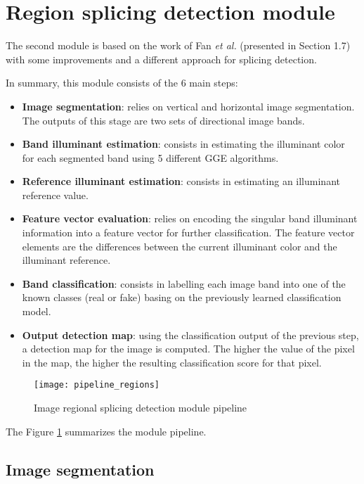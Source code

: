 \section{Region splicing detection module}

The second module is based on the work of Fan \emph{et al.}\cite{fan2015image} (presented in Section 1.7) with some improvements and a different approach for splicing detection.

In summary, this module consists of the 6 main steps:

\begin{itemize}
\item \textbf{Image segmentation}: relies on vertical and horizontal image segmentation. The outputs of this stage are two sets of directional image bands. 
\item \textbf{Band illuminant estimation}: consists in estimating the illuminant color for each segmented band using 5 different GGE algorithms.
\item \textbf{Reference illuminant estimation}: consists in estimating an illuminant reference value.
\item \textbf{Feature vector evaluation}: relies on encoding the singular band illuminant information into a feature vector for further classification. The feature vector elements are the differences between the current illuminant color and the illuminant reference.
\item \textbf{Band classification}: consists in labelling each image band into one of the known classes (real or fake) basing on the previously learned classification model.
\item \textbf{Output detection map}: using the classification output of the previous step, a detection map for the image is computed. The higher the value of the pixel in the map, the higher the resulting classification score for that pixel.
\end{itemize}

\begin{figure}[h!]
  \centering
    \texttt{[image: pipeline\_regions]}
    \caption{Image regional splicing detection module pipeline}
    \label{fig:regionsmodulepipeline}
\end{figure}

The Figure \ref{fig:regionsmodulepipeline} summarizes the module pipeline.

\subsection{Image segmentation}

